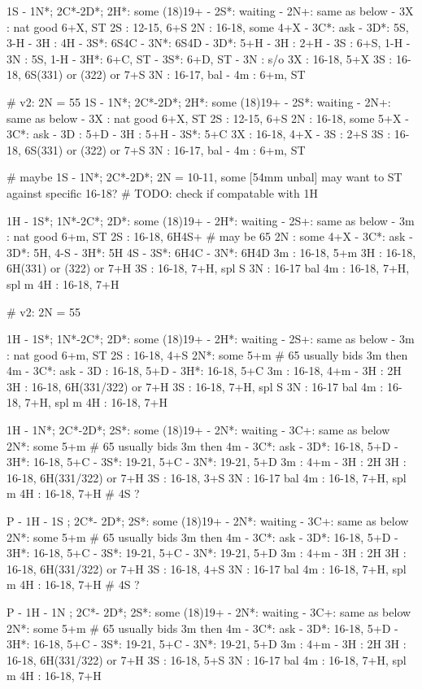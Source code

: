 1S - 1N*; 2C*-2D*; 
2H*: some (18)19+
   - 2S*: waiting
   		- 2N+: same as below
   - 3X : nat good 6+X, ST
2S : 12-15, 6+S
2N : 16-18, some 4+X
   - 3C*: ask
		- 3D*: 5S, 3-H
		- 3H : 4H
		- 3S*: 6S4C
		- 3N*: 6S4D
   - 3D*: 5+H
		- 3H : 2+H
		- 3S : 6+S, 1-H
		- 3N : 5S, 1-H
   - 3H*: 6+C, ST
   - 3S*: 6+D, ST
   - 3N : s/o
3X : 16-18, 5+X
3S : 16-18, 6S(331) or (322) or 7+S
3N : 16-17, bal
   - 4m : 6+m, ST

# v2: 2N = 55
1S - 1N*; 2C*-2D*; 
2H*: some (18)19+
   - 2S*: waiting
   		- 2N+: same as below
   - 3X : nat good 6+X, ST
2S : 12-15, 6+S
2N : 16-18, some 5+X
   - 3C*: ask
		- 3D : 5+D
		- 3H : 5+H
		- 3S*: 5+C
3X : 16-18, 4+X
   - 3S : 2+S
3S : 16-18, 6S(331) or (322) or 7+S
3N : 16-17, bal
   - 4m : 6+m, ST

# maybe 1S - 1N*; 2C*-2D*; 2N = 10-11, some [54mm unbal] may want to ST against specific 16-18? 
# TODO: check if compatable with 1H

1H - 1S*; 1N*-2C*; 
2D*: some (18)19+
   - 2H*: waiting
		- 2S+: same as below
   - 3m : nat good 6+m, ST
2S : 16-18, 6H4S+  # may be 65
2N : some 4+X
   - 3C*: ask
		- 3D*: 5H, 4-S
		- 3H*: 5H 4S
		- 3S*: 6H4C
		- 3N*: 6H4D
3m : 16-18, 5+m
3H : 16-18, 6H(331) or (322) or 7+H
3S : 16-18, 7+H, spl S
3N : 16-17 bal
4m : 16-18, 7+H, spl m
4H : 16-18, 7+H

# v2: 2N = 55

1H - 1S*; 1N*-2C*; 
2D*: some (18)19+
   - 2H*: waiting
		- 2S+: same as below
   - 3m : nat good 6+m, ST
2S : 16-18, 4+S
2N*: some 5+m  # 65 usually bids 3m then 4m
   - 3C*: ask
		- 3D : 16-18, 5+D
		- 3H*: 16-18, 5+C
3m : 16-18, 4+m
   - 3H : 2H
3H : 16-18, 6H(331/322) or 7+H
3S : 16-18, 7+H, spl S
3N : 16-17 bal
4m : 16-18, 7+H, spl m
4H : 16-18, 7+H

1H - 1N*; 2C*-2D*; 
2S*: some (18)19+
   - 2N*: waiting
		- 3C+: same as below
2N*: some 5+m  # 65 usually bids 3m then 4m
   - 3C*: ask
		- 3D*: 16-18, 5+D
		- 3H*: 16-18, 5+C
		- 3S*: 19-21, 5+C
		- 3N*: 19-21, 5+D
3m : 4+m
   - 3H : 2H
3H : 16-18, 6H(331/322) or 7+H
3S : 16-18, 3+S
3N : 16-17 bal
4m : 16-18, 7+H, spl m
4H : 16-18, 7+H
# 4S ?


P - 1H - 1S ; 2C*- 2D*; 
2S*: some (18)19+
   - 2N*: waiting
		- 3C+: same as below
2N*: some 5+m  # 65 usually bids 3m then 4m
   - 3C*: ask
		- 3D*: 16-18, 5+D
		- 3H*: 16-18, 5+C
		- 3S*: 19-21, 5+C
		- 3N*: 19-21, 5+D
3m : 4+m
   - 3H : 2H
3H : 16-18, 6H(331/322) or 7+H
3S : 16-18, 4+S
3N : 16-17 bal
4m : 16-18, 7+H, spl m
4H : 16-18, 7+H
# 4S ?

P - 1H - 1N ; 2C*- 2D*; 
2S*: some (18)19+
   - 2N*: waiting
		- 3C+: same as below
2N*: some 5+m  # 65 usually bids 3m then 4m
   - 3C*: ask
		- 3D*: 16-18, 5+D
		- 3H*: 16-18, 5+C
		- 3S*: 19-21, 5+C
		- 3N*: 19-21, 5+D
3m : 4+m
   - 3H : 2H
3H : 16-18, 6H(331/322) or 7+H
3S : 16-18, 5+S
3N : 16-17 bal
4m : 16-18, 7+H, spl m
4H : 16-18, 7+H
